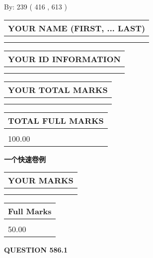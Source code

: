 \documentclass{ctexart}
\begin{document}
   
\hspace{1.0in} By: 
 239 ( 416 ,  613 )
   
   
   
   
\newpage 
\setcounter{page}{ 
   586001 } 
   
   
   
   
\noindent\begin{tabular}{|l|}
\hline
YOUR NAME (FIRST, ... LAST)  \\
\hline
 \\ 
 \\ 
\hline
\end{tabular}
\hspace{0.05in} \begin{tabular}{|l|}
\hline
 YOUR   ID   INFORMATION  \\
\hline
 \\ 
 \\ 
\hline
\end{tabular}
   
   
\vspace{0.2in}\noindent\begin{tabular}{|l|}
\hline
YOUR TOTAL MARKS  \\
\hline
 \\ 
 \\ 
\hline
\end{tabular}
\hspace{0.05in} \begin{tabular}{|l|}
\hline
TOTAL FULL MARKS  \\
\hline
 \\ 
100.00 \\
\hline
\end{tabular}
   
   
 \vspace{0.2in}
{\LARGE {\textbf{ 一个快速卷例}}}
   
   
  
\vspace{0.2in}
  
\noindent\begin{tabular}{|l|}
\hline
 YOUR MARKS  \\
\hline
 \\ 
 \\ 
\hline
\end{tabular}
\hspace{0.05in} \begin{tabular}{|l|}
\hline
 Full Marks  \\
\hline
 \\ 
50.00 \\
\hline
\end{tabular}
{\textbf{\Large{QUESTION
586.1 
}}}
  
\end{document}
